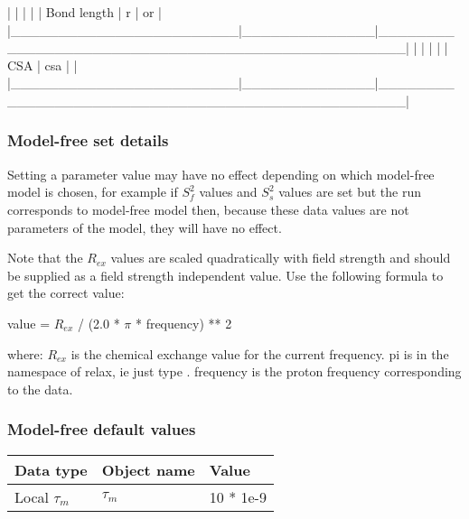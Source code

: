 |                        |              |                                                  |
| Bond length            | r            | 
 or 
                 |
|\_\_\_\_\_\_\_\_\_\_\_\_\_\_\_\_\_\_\_\_\_\_\_\_|\_\_\_\_\_\_\_\_\_\_\_\_\_\_|\_\_\_\_\_\_\_\_\_\_\_\_\_\_\_\_\_\_\_\_\_\_\_\_\_\_\_\_\_\_\_\_\_\_\_\_\_\_\_\_\_\_\_\_\_\_\_\_\_\_|
|                        |              |                                                  |
| CSA                    | csa          | 
                                 |
|\_\_\_\_\_\_\_\_\_\_\_\_\_\_\_\_\_\_\_\_\_\_\_\_|\_\_\_\_\_\_\_\_\_\_\_\_\_\_|\_\_\_\_\_\_\_\_\_\_\_\_\_\_\_\_\_\_\_\_\_\_\_\_\_\_\_\_\_\_\_\_\_\_\_\_\_\_\_\_\_\_\_\_\_\_\_\_\_\_|



\subsubsection{Model-free set details}

Setting a parameter value may have no effect depending on which model-free model is chosen,
for example if $S^2_f$ values and $S^2_s$ values are set but the run corresponds to model-free model
 then, because these data values are not parameters of the model, they will have no
effect.

Note that the $R_{ex}$ values are scaled quadratically with field strength and should be supplied
as a field strength independent value.  Use the following formula to get the correct value:

    value = $R_{ex}$ / (2.0 * $\pi$ * frequency) ** 2

where:
    $R_{ex}$ is the chemical exchange value for the current frequency.
    pi is in the namespace of relax, ie just type 
.
    frequency is the proton frequency corresponding to the data.


\subsubsection{Model-free default values}



\begin{center}
\begin{tabular}{lll}
\toprule
Data type & Object name & Value \\
\midrule
Local $\tau_m$ & $\tau_m$ & 10 * 1e-9 \\
\bottomrule
\end{tabular}
\end{center}

